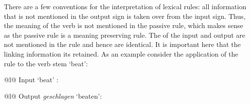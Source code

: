 \noindent
There are a few conventions for the interpretation of lexical rules: all information that is not mentioned
in the output sign is taken over from the input sign. Thus, the meaning of the verb is not mentioned
in the passive rule, which makes sense as the passive rule is a meaning preserving rule. The \contvs
of the input and output are not mentioned in the rule and hence are identical. It is important here that the linking
information its retained. As an example consider the application of the rule to the verb stem
 `beat': 
\eal
\label{lr-passiv-beispiel}
\ex 
\begin{tabular}[t]{@{}l@{}}
Input  `beat' :\\
\end{tabular}
\ex 
\begin{tabular}[t]{@{}l@{}}
Output \emph{geschlagen} `beaten':\\
\end{tabular}
